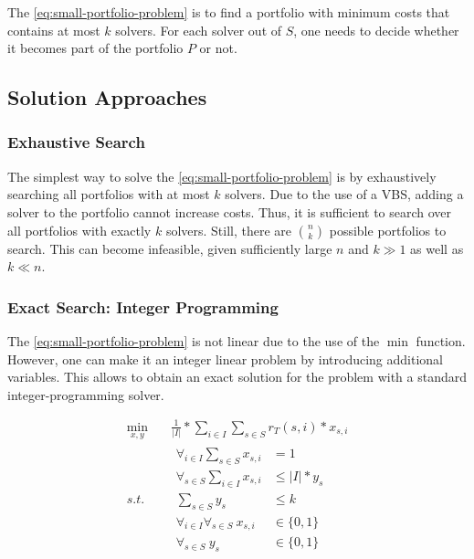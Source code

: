 \documentclass[conference]{IEEEtran}
\begin{document}
The \ref{eq:small-portfolio-problem} is to find a portfolio with minimum costs that contains at most $k$ solvers.
For each solver out of $S$, one needs to decide whether it becomes part of the portfolio $P$ or not.

\subsection{Solution Approaches}
\label{sec:approach:solution}

\subsubsection{Exhaustive Search}

The simplest way to solve the \ref{eq:small-portfolio-problem} is by exhaustively searching all portfolios with at most $k$ solvers.
Due to the use of a VBS, adding a solver to the portfolio cannot increase costs.
Thus, it is sufficient to search over all portfolios with exactly $k$ solvers.
Still, there are $\binom{n}{k}$ possible portfolios to search.
This can become infeasible, given sufficiently large $n$ and $k \gg 1$ as well as $k \ll n$.

\subsubsection{Exact Search: Integer Programming}

The \ref{eq:small-portfolio-problem} is not linear due to the use of the $\min$ function.
However, one can make it an integer linear problem by introducing additional variables.
This allows to obtain an exact solution for the problem with a standard integer-programming solver.

\begin{equation}
	\label{eq:small-portfolio-integer-problem}
	\begin{aligned}
		\min_{x,y} \quad & \frac{1}{|I|} * \sum_{i \in I} \sum_{s \in S} r_T(s,i) * x_{s,i} \\
		s.t. \quad & \begin{aligned}
			\forall_{i\in I} \sum_{s \in S} x_{s,i} &= 1\\
			\forall_{s \in S} \sum_{i \in I} x_{s,i} &\leq |I| * y_s\\
			\sum_{s \in S} y_s &\leq k\\
			\forall_{i\in I} \forall_{s \in S}~x_{s,i} &\in \{0, 1\}\\
			\forall_{s \in S}~y_s &\in \{0,1\}
		\end{aligned}
	\end{aligned}
	\tag{Small-Portfolio Integer Problem}
\end{equation}
\end{document}
